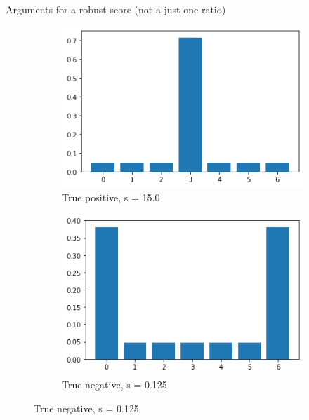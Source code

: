 \documentclass[xcolor=table, hyperref={pdfpagelabels=false}]{beamer}
\begin{document}
\begin{frame}{Arguments for a robust score (not a just one ratio)}
\begin{figure}[H]
	\centering
	\begin{subfigure}[t]{.4\textwidth}
		\includegraphics[width=\textwidth]{./images/true_positive.png}
		\caption{True positive, s = 15.0}
	\end{subfigure}
	\begin{subfigure}[t]{.4\textwidth}
		\includegraphics[width=\textwidth]{./images/true_negative.png}
		\caption{True negative, s = 0.125}
	\end{subfigure}
\end{figure}
\begin{figure}[H]\ContinuedFloat
	\centering
	\begin{subfigure}[t]{.4\textwidth}

\end{subfigure}
\end{figure}
\end{frame}
\end{document}

